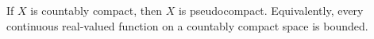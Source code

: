 If $X$ is countably compact, then $X$ is pseudocompact. Equivalently, every continuous real-valued function on a countably compact space is bounded.
